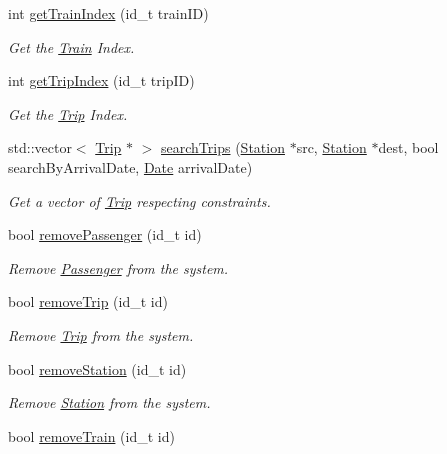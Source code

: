 \begin{DoxyCompactItemize}
int \mbox{\hyperlink{classSystem_a15d033a2efda45b83bbe0800698ae712}{get\+Train\+Index}} (id\+\_\+t train\+ID)
\begin{DoxyCompactList}\small\item\em Get the \mbox{\hyperlink{classTrain}{Train}} Index. \end{DoxyCompactList}\item 
int \mbox{\hyperlink{classSystem_aa431fdc152458fc39efb9a60e9f62f01}{get\+Trip\+Index}} (id\+\_\+t trip\+ID)
\begin{DoxyCompactList}\small\item\em Get the \mbox{\hyperlink{classTrip}{Trip}} Index. \end{DoxyCompactList}\item 
std\+::vector$<$ \mbox{\hyperlink{classTrip}{Trip}} $\ast$ $>$ \mbox{\hyperlink{classSystem_a293b247432ab577c9bf0ba7285a6eeda}{search\+Trips}} (\mbox{\hyperlink{classStation}{Station}} $\ast$src, \mbox{\hyperlink{classStation}{Station}} $\ast$dest, bool search\+By\+Arrival\+Date, \mbox{\hyperlink{classDate}{Date}} arrival\+Date)
\begin{DoxyCompactList}\small\item\em Get a vector of \mbox{\hyperlink{classTrip}{Trip}} respecting constraints. \end{DoxyCompactList}\item 
bool \mbox{\hyperlink{classSystem_af31acdda711986978533367ce3a64276}{remove\+Passenger}} (id\+\_\+t id)
\begin{DoxyCompactList}\small\item\em Remove \mbox{\hyperlink{classPassenger}{Passenger}} from the system. \end{DoxyCompactList}\item 
bool \mbox{\hyperlink{classSystem_ae802cde42ae56b50adc02c76920e9001}{remove\+Trip}} (id\+\_\+t id)
\begin{DoxyCompactList}\small\item\em Remove \mbox{\hyperlink{classTrip}{Trip}} from the system. \end{DoxyCompactList}\item 
bool \mbox{\hyperlink{classSystem_ae582dd1c79cbd879ba1fbec5ceaab2fb}{remove\+Station}} (id\+\_\+t id)
\begin{DoxyCompactList}\small\item\em Remove \mbox{\hyperlink{classStation}{Station}} from the system. \end{DoxyCompactList}\item 
bool \mbox{\hyperlink{classSystem_acf1d845cdb88b43143b3f738214e866b}{remove\+Train}} (id\+\_\+t id)

\end{DoxyCompactItemize}
